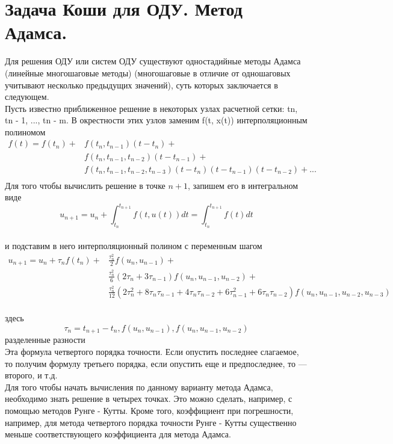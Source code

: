 \documentclass[12pt,a4paper]{article}
\begin{document}
	\section{Задача Коши для ОДУ. Метод Адамса.}
	Для решения ОДУ или систем ОДУ существуют одностадийные методы Адамса (линейные многошаговые методы) (многошаговые в отличие от одношаговых учитывают несколько предыдущих значений), суть которых заключается в следующем.\\	
	Пусть известно приближенное решение в некоторых узлах расчетной сетки: tn, tn - 1, ..., tn - m. В окрестности этих узлов заменим f(t, x(t)) интерполяционным полиномом\\
	\begin{align*}
	f(t) = f(t_n) + &f(t_n, t_{n-1})(t-t_n)+\\
	&f(t_n, t_{n-1},t_{n-2})(t-t_{n-1})+\\
	&f(t_n, t_{n-1},t_{n-2}, t_{n-3})(t-t_n)(t-t_{n-1})(t-t_{n-2})+... \\
	\end{align*}
	Для того чтобы вычислить решение в точке $n + 1$, запишем его в интегральном виде\\
	\begin{equation*}
	u_{n+1} = u_n + \int_{t_n}^{t_{n+1}} f(t,u(t))dt = \int_{t_n}^{t_{n+1}}f(t)dt
	\end{equation*}\\
	и подставим в него интерполяционный полином с переменным шагом\\
	\begin{align*}
	u_{n+1} = u_n + \tau_n f(t_n) + &\frac{\tau^2_n}{2}f(u_n, u_{n-1}) + \\
	 &\frac{\tau^2_n}{6}(2\tau_n + 3\tau_{n-1})f(u_n, u_{n-1}, u_{n-2}) + \\
	 &\frac{\tau^2_n}{12}(2\tau^2_n+8\tau_n\tau_{n-1}+4\tau_n\tau_{n-2} + 6\tau^2_{n-1} + 6\tau_n\tau_{n-2})f(u_n, u_{n-1}, u_{n-2}, u_{n-3})
	\end{align*}\\
	здесь\\
	\begin{equation*}
	\tau_n = t_{n+1} - t_n, f(u_n, u_{n-1}), f(u_n, u_{n-1}, u_{n-2})
	\end{equation*}
	разделенные разности\\
	Эта формула четвертого порядка точности. Если опустить последнее слагаемое, то получим формулу третьего порядка, если опустить еще и предпоследнее, то — второго, и т.д.\\
	Для того чтобы начать вычисления по данному варианту метода Адамса, необходимо знать решение в четырех точках. Это можно сделать, например, с помощью методов Рунге - Кутты. Кроме того, коэффициент при погрешности, например, для метода четвертого порядка точности Рунге - Кутты существенно меньше соответствующего коэффициента для метода Адамса.\\\\	
\end{document}
